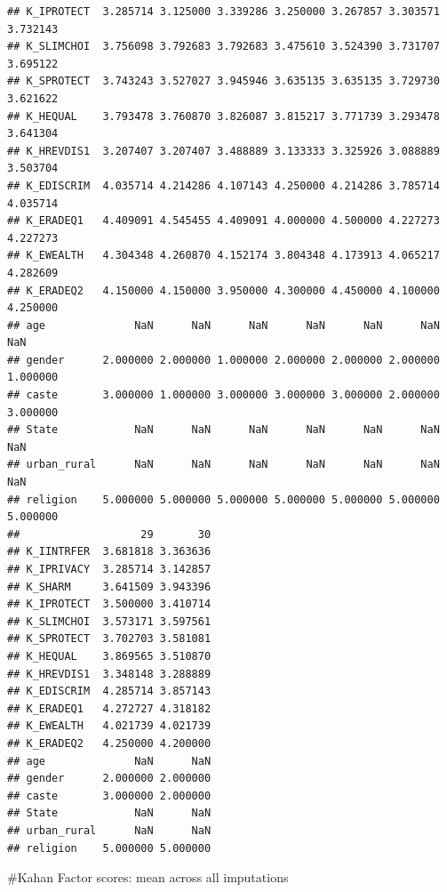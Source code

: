 \documentclass[
]{article}
\begin{document}
\begin{verbatim}
## K_IPROTECT  3.285714 3.125000 3.339286 3.250000 3.267857 3.303571 3.732143
## K_SLIMCHOI  3.756098 3.792683 3.792683 3.475610 3.524390 3.731707 3.695122
## K_SPROTECT  3.743243 3.527027 3.945946 3.635135 3.635135 3.729730 3.621622
## K_HEQUAL    3.793478 3.760870 3.826087 3.815217 3.771739 3.293478 3.641304
## K_HREVDIS1  3.207407 3.207407 3.488889 3.133333 3.325926 3.088889 3.503704
## K_EDISCRIM  4.035714 4.214286 4.107143 4.250000 4.214286 3.785714 4.035714
## K_ERADEQ1   4.409091 4.545455 4.409091 4.000000 4.500000 4.227273 4.227273
## K_EWEALTH   4.304348 4.260870 4.152174 3.804348 4.173913 4.065217 4.282609
## K_ERADEQ2   4.150000 4.150000 3.950000 4.300000 4.450000 4.100000 4.250000
## age              NaN      NaN      NaN      NaN      NaN      NaN      NaN
## gender      2.000000 2.000000 1.000000 2.000000 2.000000 2.000000 1.000000
## caste       3.000000 1.000000 3.000000 3.000000 3.000000 2.000000 3.000000
## State            NaN      NaN      NaN      NaN      NaN      NaN      NaN
## urban_rural      NaN      NaN      NaN      NaN      NaN      NaN      NaN
## religion    5.000000 5.000000 5.000000 5.000000 5.000000 5.000000 5.000000
##                   29       30
## K_IINTRFER  3.681818 3.363636
## K_IPRIVACY  3.285714 3.142857
## K_SHARM     3.641509 3.943396
## K_IPROTECT  3.500000 3.410714
## K_SLIMCHOI  3.573171 3.597561
## K_SPROTECT  3.702703 3.581081
## K_HEQUAL    3.869565 3.510870
## K_HREVDIS1  3.348148 3.288889
## K_EDISCRIM  4.285714 3.857143
## K_ERADEQ1   4.272727 4.318182
## K_EWEALTH   4.021739 4.021739
## K_ERADEQ2   4.250000 4.200000
## age              NaN      NaN
## gender      2.000000 2.000000
## caste       3.000000 2.000000
## State            NaN      NaN
## urban_rural      NaN      NaN
## religion    5.000000 5.000000
\end{verbatim}

\#Kahan Factor scores: mean across all imputations
\end{document}
